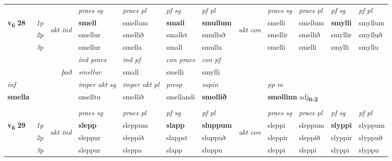 \begin{longtable}[l]{X>{\footnotesize\itshape}llXXXXlXXXX}
 & &   & \textit{praes sg}  & \textit{praes pl}    & \textit{ pf sg} & \textit{pf pl} & & \textit{praes sg}  & \textit{praes pl}    & \textit{pf sg} & \textit{pf pl }  \\ \cmidrule{4-7} \cmidrule{9-12}
 \multirow{2}{*}{{{\textbf{v{\textsubscript{6}}} \Large{\textbf{28}}}}}  & 1p & \multirow{3}{*}{\begin{turn}{90}\textit{akt ind}\end{turn}} & \textbf{smell} & smellum & \textbf{small} & \textbf{smullum} & \multirow{3}{*}{\begin{turn}{90}\textit{akt con}\end{turn}} &smelli & smellum & \textbf{smylli} & smyllum\\*
 & 2p &  &  smellur  & smellið & smallst & smulluð & & smellir & smellið & smyllir & smylluð \\*
 & 3p &  & smellur & smella & small & smullu & & smelli & smelli& smylli & smyllu \\*
\cmidrule{4-7} \cmidrule{9-12}

   && &  \textit{ind praes} & \textit{ind pf} & \textit{con praes} & \textit{con pf} \\*
\multicolumn{3}{r}{\textit{það}} & smellur & small & smelli & smylli \\*

\cmidrule{4-7}
   {\textit{inf}} & &  & \textit{imper akt sg} & \textit{imper akt pl}   & \textit{presp} & \textit{supin}  && \textit{pp m} \\*
  {\textbf{smella}} & && smelltu  & smellið   & smellandi &  \textbf{smollið}  && \multicolumn{2}{l}{\textbf{smollinn} adj\textbf{\textsubscript{6-2}}} \\*

\midrule
  & \\
   \midrule
 & &   & \textit{praes sg}  & \textit{praes pl}    & \textit{ pf sg} & \textit{pf pl} & & \textit{praes sg}  & \textit{praes pl}    & \textit{pf sg} & \textit{pf pl }  \\ \cmidrule{4-7} \cmidrule{9-12}
 \multirow{2}{*}{{{\textbf{v{\textsubscript{6}}} \Large{\textbf{29}}}}}  & 1p & \multirow{3}{*}{\begin{turn}{90}\textit{akt ind}\end{turn}} & \textbf{slepp} & sleppum & \textbf{slapp} & \textbf{sluppum} & \multirow{3}{*}{\begin{turn}{90}\textit{akt con}\end{turn}} &sleppi & sleppum & \textbf{slyppi} & slyppum\\*
 & 2p &  &  sleppur  & sleppið & slappst & sluppuð & & sleppir & sleppið & slyppir & slyppuð \\*
 & 3p &  & sleppur & sleppa & slapp & sluppu & & sleppi & sleppi& slyppi & slyppu \\*
\cmidrule{4-7} \cmidrule{9-12}


\end{longtable}
